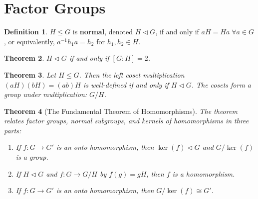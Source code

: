 \documentclass[11pt]{amsart}
\newtheorem{theorem}{Theorem}[section]
\theoremstyle{definition}
\newtheorem{definition}[theorem]{Definition}
\begin{document}
\section{Factor Groups}
\begin{definition}
	$H \leq G$ is \textbf{normal}, denoted $H \vartriangleleft G$, if and only if $aH = Ha \; \forall a \in G$, or equivalently, $a^{-1}h_1 a = h_2$ 
	for $h_1, h_2 \in H$.
\end{definition}
\begin{theorem}
	$H \vartriangleleft G$ if and only if $[ G : H ] = 2$.
\end{theorem}
\begin{theorem}
	Let $H \leq G$. Then the left coset multiplication $(aH)(bH) = (ab)H$ is well-defined if and only if $H \vartriangleleft G$. The cosets form
	a group under multiplication: $G/H$.
\end{theorem}
\begin{theorem}[The Fundamental Theorem of Homomorphisms]
	The theorem relates factor groups, normal subgroups, and kernels of homomorphisms in three parts:
	\begin{enumerate}
		\item{If $f: G \to G'$ is an onto homomorphism, then $\ker(f) \vartriangleleft G$ and $G / \ker(f)$ is a group. }
		\item{If $H \vartriangleleft G$ and $f: G \to G/H$ by $f(g) = gH$, then $f$ is a homomorphism. }
		\item{If $f: G \to G'$ is an onto homomorphism, then $G / \ker(f) \cong G'$. }
	\end{enumerate}
\end{theorem}
\end{document}
